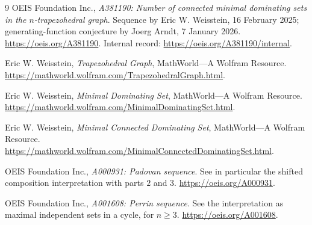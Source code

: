 \documentclass[11pt,letterpaper]{article}
\numberwithin{equation}{section}
\theoremstyle{definition}
\newcommand{\1}{\mathbf 1}
\begin{document}
\begin{thebibliography}{9}
OEIS Foundation Inc., \emph{A381190: Number of connected minimal dominating sets
in the $n$-trapezohedral graph}. Sequence by Eric W. Weisstein, 16 February 2025;
generating-function conjecture by Joerg Arndt, 7 January 2026.
\url{https://oeis.org/A381190}.
Internal record: \url{https://oeis.org/A381190/internal}.

Eric W. Weisstein, \emph{Trapezohedral Graph}, MathWorld---A Wolfram Resource.
\url{https://mathworld.wolfram.com/TrapezohedralGraph.html}.

Eric W. Weisstein, \emph{Minimal Dominating Set}, MathWorld---A Wolfram Resource.
\url{https://mathworld.wolfram.com/MinimalDominatingSet.html}.

Eric W. Weisstein, \emph{Minimal Connected Dominating Set}, MathWorld---A Wolfram
Resource. \url{https://mathworld.wolfram.com/MinimalConnectedDominatingSet.html}.

OEIS Foundation Inc., \emph{A000931: Padovan sequence}.
See in particular the shifted composition interpretation with parts $2$ and $3$.
\url{https://oeis.org/A000931}.

OEIS Foundation Inc., \emph{A001608: Perrin sequence}.
See the interpretation as maximal independent sets in a cycle, for $n\ge3$.
\url{https://oeis.org/A001608}.
\end{thebibliography}
\end{document}
